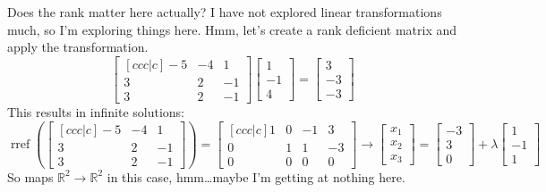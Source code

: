 \documentclass[basic]{inVerba-notes}
\begin{document}
\begin{enumerate}[align=left, leftmargin=0pt, labelindent=\parindent, listparindent=\parindent, labelwidth=0pt, itemindent=!]
  Does the rank matter here actually? I have not explored linear transformations much, so I'm exploring things here. Hmm, let's create a rank deficient matrix and apply the transformation.
  \[%
  \begin{bmatrix}[ccc|c]
    -5 & -4 & 1 \\
    3 & 2 & -1  \\
    3 & 2 & -1  
  \end{bmatrix} 
  \begin{bmatrix} 1 \\ -1 \\ 4 \end{bmatrix} =
  \begin{bmatrix} 3 \\ -3 \\ -3 \end{bmatrix}
  \]%
  This results in infinite solutions:
  \[%
  \operatorname{rref}\left(\begin{bmatrix}[ccc|c]
    -5 & -4 & 1 \\
    3 & 2 & -1  \\
    3 & 2 & -1  
  \end{bmatrix}\right)
  =
  \begin{bmatrix}[ccc|c]
    1 & 0 & -1 & 3 \\
    0 & 1 & 1 & -3 \\
    0 & 0 & 0 & 0 
  \end{bmatrix} 
  \to 
  \begin{bmatrix} x_1 \\ x_2 \\ x_3 \end{bmatrix} = 
  \begin{bmatrix} -3 \\ 3 \\ 0 \end{bmatrix} + \lambda
  \begin{bmatrix} 1 \\ -1 \\ 1 \end{bmatrix}
  \]%
  So  maps \(\mathbb{R}^2 \to \mathbb{R}^2\) in this case, hmm\dots maybe I'm getting at nothing here. 

\end{enumerate}
\end{document}
